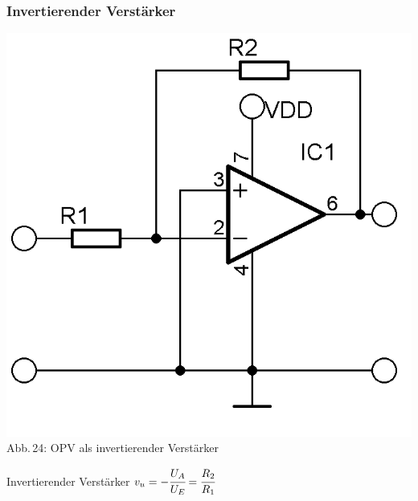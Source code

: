 \begin{frame}
  \frametitle{Invertierender Verstärker}
  \begin{minipage}{0.4\textwidth}
    \begin{center}
      \includegraphics[width=\textwidth,height=.85\textheight,keepaspectratio]{a06/OPV-Inverter.png}\\
      {\tiny Abb.\,24: OPV als invertierender Verstärker}
    \end{center}
  \end{minipage}
  \hspace{2pc}
  \begin{minipage}{0.5\textwidth}
    \centering
    \begin{block}{Invertierender Verstärker}
      $v_u = -\cfrac{U_A}{U_E} = \cfrac{R_2}{R_1}$
    \end{block}
  \end{minipage}
\end{frame}

